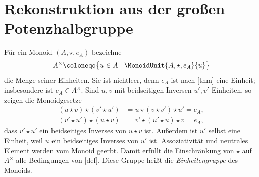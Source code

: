 \documentclass[main.tex]{subfiles}
\begin{document}
\begin{tabproof}
\end{tabproof}

\section{Rekonstruktion aus der großen Potenzhalbgruppe}

Für ein Monoid \((A,\star,e_A)\) bezeichne
\[
  A^\times
  \coloneqq
  \bigl\{u\in A\bigm|
    \MonoidUnit{A,\star,e_A}{u}\bigr\}
\]
die Menge seiner Einheiten.  Sie ist nichtleer, denn \(e_A\) ist nach
[thm] eine Einheit; insbesondere ist
\(e_A\in A^\times\).  Sind \(u,v\) mit beidseitigen Inversen \(u',v'\)
Einheiten, so zeigen die Monoidgesetze
\[
\begin{aligned}
  (u\star v)\star(v'\star u')
    &=u\star(v\star v')\star u'=e_A,\\
  (v'\star u')\star(u\star v)
    &=v'\star(u'\star u)\star v=e_A,
\end{aligned}
\]
dass \(v'\star u'\) ein beidseitiges Inverses von \(u\star v\) ist.
Außerdem ist \(u'\) selbst eine Einheit, weil \(u\) ein beidseitiges
Inverses von \(u'\) ist.  Assoziativität und neutrales Element werden vom
Monoid geerbt.  Damit erfüllt die Einschränkung von \(\star\) auf
\(A^\times\) alle Bedingungen von [def].  Diese
Gruppe heißt die \emph{Einheitengruppe} des Monoids.
\end{document}
